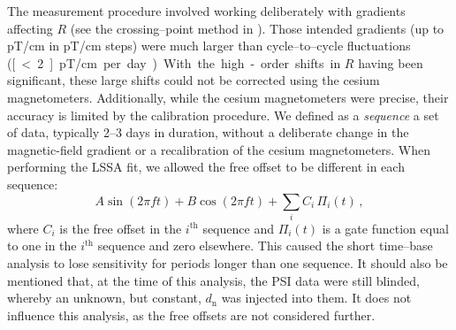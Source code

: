 The measurement procedure involved working deliberately with gradients affecting $R$ (see the crossing--point method in \cite{Pendlebury2015}). Those intended gradients (up to \unit[60]{pT/cm} in \unit[10]{pT/cm} steps) were much larger than cycle--to--cycle fluctuations (\unit[< 2]{pT/cm} per day). With the high-order shifts in $R$ having been significant, these large shifts could not be corrected using the cesium magnetometers. Additionally, while the cesium magnetometers were precise, their accuracy is limited by the calibration procedure. We defined as a \emph{sequence} a set of data, typically 2--3 days in duration, without a deliberate change in the magnetic-field gradient or a recalibration of the cesium magnetometers.
When performing the LSSA fit, we allowed the free offset to be different in each sequence:
\begin{equation}
    A\sin(2 \pi f t) + B\cos(2 \pi f t) + \sum_i C_i\,\Pi_i(t) \, ,
\end{equation}
where $C_i$ is the free offset in the $i^\textrm{th}$ sequence and $\Pi_i(t)$ is a gate function equal to one in the $i^\textrm{th}$ sequence and zero elsewhere.
This caused the short time--base analysis to lose sensitivity for periods longer than one sequence.
It should also be mentioned that, at the time of this analysis, the PSI data were still blinded, whereby an unknown, but constant, $d_\mathrm{n}$ was injected into them. It does not influence this analysis, as the free offsets are not considered further.


